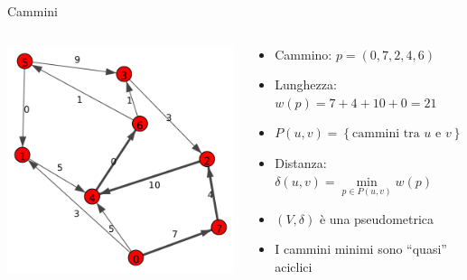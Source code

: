 \documentclass{beamer}
\theoremstyle{plain}
\theoremstyle{definition}
\theoremstyle{remark}
\newcommand{\set}[1]{\left\{#1\right\}}
\newcommand{\pa}[1]{\left(#1\right)}
\begin{document}
\begin{frame}{Cammini}
  \begin{columns}
    \begin{column}{0.40\textwidth}
      \includegraphics[width=\textwidth]{directpath}
    \end{column}
    \begin{column}{0.58\textwidth}
      \begin{itemize}
      \item<1-> Cammino: $p = \pa{ 0,7,2, 4,6}$
      \item<1-> Lunghezza: $w(p) = 7+4+10+0 = 21$
      \item<2-> $P(u,v) = \set{\text{cammini tra }u\text{ e }v}$
      \item<2-> Distanza: $\delta (u,v) = \min \limits _{p\in P(u,v)}
        w(p)$
      \item<3-> $\pa{V,\delta}$ \`e una pseudometrica
      \item<3-> I cammini minimi sono ``quasi'' aciclici
      \end{itemize}
    \end{column}
  \end{columns}
\end{frame}
\end{document}
